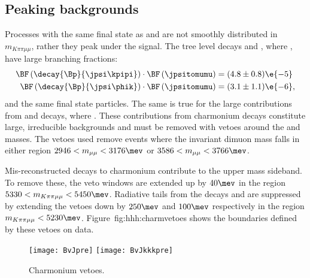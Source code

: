 \subsection{Peaking backgrounds}
Processes with the same final state as \btokpipimumu and \btophikmumu are not smoothly distributed
in $m_{K\pi\pi\mu\mu}$, rather they peak under the signal.
The tree level decays \decay{\Bp}{\jpsi\kpipi} and \decay{\Bp}{\jpsi\phik}, where
\decay{\jpsi}{\mumu}, have large branching fractions:
\begin{align}
  \BF\left(\decay{\Bp}{\jpsi\kpipi}\right)
  \cdot \BF\left(\jpsitomumu\right)
  &= (4.8 \pm 0.8)\e{-5} \\
  \BF\left(\decay{\Bp}{\jpsi\phik}\right)
  \cdot \BF\left(\jpsitomumu\right)
  &= (3.1 \pm 1.1)\e{-6},
\end{align}
and the same final state particles.
The same is true for the large contributions from \decay{\Bp}{\psitwos\kpipi} and
\decay{\Bp}{\psitwos\phik} decays, where \decay{\psitwos}{\mumu}.
These contributions from charmonium decays constitute large, irreducible backgrounds and must be
removed with vetoes around the \jpsi and \psitwos masses.
The vetoes used remove events where the invariant dimuon mass falls in either region
$2946<m_{\mu\mu}<3176\mev$ or $3586<m_{\mu\mu}<3766\mev$.

Mis-reconstructed decays to charmonium contribute to the upper mass sideband.
To remove these, the veto windows are extended up by $40\mev$ in the region
$5330<m_{K\pi\pi\mu\mu}<5450\mev$.
Radiative tails from the decays \decay{\jpsi}{\mumu\gamma} and \decay{\psitwos}{\mumu\gamma} are
suppressed by extending the vetoes down by $250\mev$ and $100\mev$ respectively in the region
$m_{K\pi\pi\mu\mu}<5230\mev$.
Figure~{fig:hhh:charmvetoes} shows the boundaries defined by these vetoes on data.


\begin{figure}
  \begin{center}
    \texttt{[image: BvJpre]}
    \texttt{[image: BvJkkkpre]}
    \caption{\small
      Charmonium vetoes.
    }
    \label{fig:hhh:charmvetoes}
  \end{center}
\end{figure}

